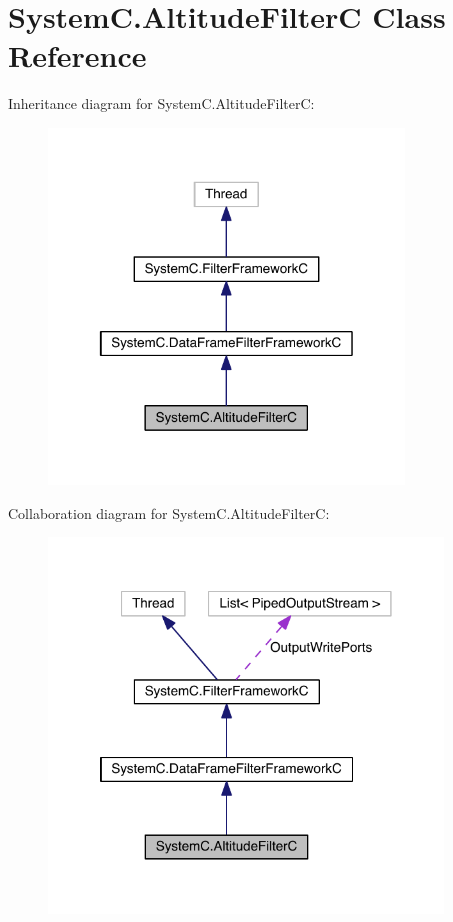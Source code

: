 \hypertarget{class_system_c_1_1_altitude_filter_c}{}\section{System\+C.\+Altitude\+Filter\+C Class Reference}
\label{class_system_c_1_1_altitude_filter_c}


Inheritance diagram for System\+C.\+Altitude\+Filter\+C\+:
\nopagebreak
\begin{figure}[H]
\begin{center}
\leavevmode
\includegraphics[width=268pt]{class_system_c_1_1_altitude_filter_c__inherit__graph}
\end{center}
\end{figure}


Collaboration diagram for System\+C.\+Altitude\+Filter\+C\+:
\nopagebreak
\begin{figure}[H]
\begin{center}
\leavevmode
\includegraphics[width=297pt]{class_system_c_1_1_altitude_filter_c__coll__graph}
\end{center}
\end{figure}

